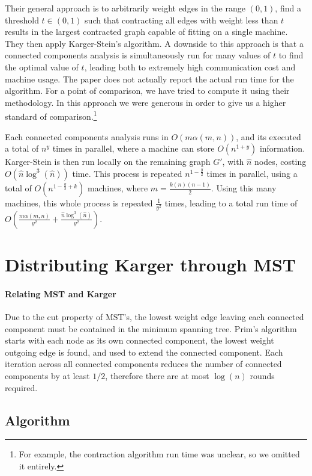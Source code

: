\documentclass{article}
\begin{document}
Their general approach is to arbitrarily weight edges in the range $(0,1)$, find a threshold $t \in (0,1)$ such that contracting all edges with weight less than $t$ results in the largest contracted graph capable of fitting on a single machine. They then apply Karger-Stein's algorithm. A downside to this approach is that a connected components analysis is simultaneously run for many values of $t$ to find the optimal value of $t$, leading both to extremely high communication cost and machine usage. The paper does not actually report the actual run time for the algorithm. For a point of comparison, we have tried to compute it using their methodology. In this approach we were generous in order to give us a higher standard of comparison.\footnote{For example, the contraction algorithm run time was unclear, so we omitted it entirely.}

Each connected components analysis runs in $O(m \alpha(m,n))$, and its executed a total of $n^y$ times in parallel, where a machine can store $O(n^{1+y})$ information. Karger-Stein is then run locally on the remaining graph $G'$, with $\hat{n}$ nodes, costing $O(\hat{n}\log^3(\hat{n}))$ time. This process is repeated $n^{1-\frac{y}{2}}$ times in parallel, using a total of $O(n^{1 - \frac{y}{2} + k})$ machines, where $ m = \frac{k (n)(n-1)}{2}$. Using this many machines, this whole process is repeated $\frac{1}{y^2}$ times, leading to a total run time of \\
$O(\frac{m \alpha(m,n)}{y^2} + \frac{\hat{n} \log^3(\hat{n})}{y^2})$.

\section{Distributing Karger through MST}

\paragraph{Relating MST and Karger}
Due to the cut property of MST's, the lowest weight edge leaving each connected component must be contained in the minimum spanning tree. Prim's algorithm \cite{Prim} starts with each node as its own connected component, the lowest weight outgoing edge is found, and used to extend the connected component. Each iteration across all connected components reduces the number of connected components by at least $1/2$, therefore there are at most $\log(n)$ rounds required. 

\subsection{Algorithm}
\end{document}
